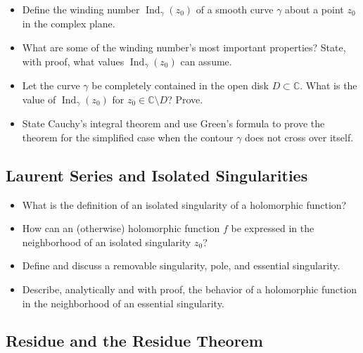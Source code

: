 \begin{itemize}

	\item Define the winding number $ \operatorname{Ind}_{\gamma}(z_0) $ of a smooth curve $ \gamma $ about a point $ z_0 $ in the complex plane. 
	
	\item What are some of the winding number's most important properties? State, with proof, what values $ \operatorname{Ind}_{\gamma}(z_0) $ can assume. 
	
	\item Let the curve $ \gamma $ be completely contained in the open disk $ D \subset \mathbb{C} $. What is the value of $ \operatorname{Ind}_{\gamma}(z_0) $ for $ z_0 \in \mathbb{C} \setminus D $? Prove. 

	\item State Cauchy's integral theorem and use Green's formula to prove the theorem for the simplified case when the contour $ \gamma $ does not cross over itself.

\end{itemize}

\subsection{Laurent Series and Isolated Singularities}

\begin{itemize}
	
	\item What is the definition of an isolated singularity of a holomorphic function? 
	
	\item How can an (otherwise) holomorphic function $ f $ be expressed in the neighborhood of an isolated singularity $ z_0 $?
	
	\item Define and discuss a removable singularity, pole, and essential singularity. 
	
	\item Describe, analytically  and with proof, the behavior of a holomorphic function in the neighborhood of an essential singularity. 


\end{itemize}


\subsection{Residue and the Residue Theorem}

